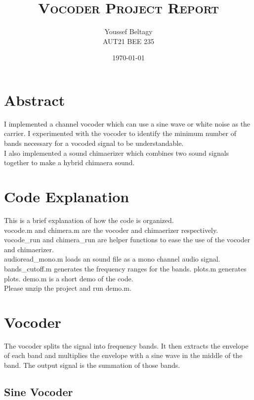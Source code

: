 \documentclass[11pt]{article}
\title{
    \textsc{Vocoder Project Report}
}
\author{
    \Large{Youssef Beltagy} \\
    \large \textsc{AUT21 BEE 235}
}
\date{\today}
\begin{document}
\maketitle %
\pagebreak


\section{Abstract}

I implemented a channel vocoder which can use a sine wave or
white noise as the carrier.
I experimented with the vocoder to identify the minimum number of 
bands necessary for a vocoded signal to be understandable.\\

I also implemented a sound chimaerizer which combines two sound signals
together to make a hybrid chimaera sound.

\section{Code Explanation}

This is a brief explanation of how the code is organized.\\

vocode.m and chimera.m are the vocoder and chimaerizer respectively.
vocode\_run and chimera\_run are helper functions to ease the use
of the vocoder and chimaerizer.\\

audioread\_mono.m loads an sound file as a mono channel audio signal.
bands\_cutoff.m generates the frequency ranges for the bands.
plots.m generates plots.
demo.m is a short demo of the code.\\

Please unzip the project and run demo.m.



\section{Vocoder}

The vocoder splits the signal into frequency bands.
It then extracts the envelope of each band and multiplies the
envelope with a sine wave in the middle of the band.
The output signal is the summation of those bands.\\

\subsection{Sine Vocoder}
\end{document}
